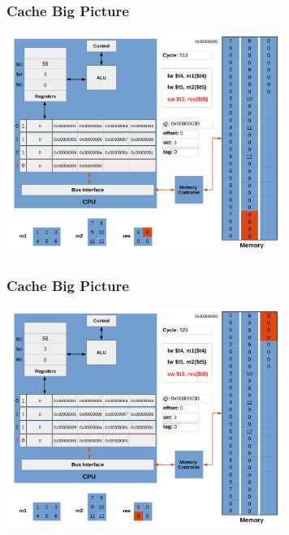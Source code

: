 \documentclass{beamer}
\begin{document}
\begin{frame}[fragile]
\frametitle{Cache Big Picture}

\begin{center}
\vspace*{-0.23cm}
\hspace*{-1cm}\includegraphics[width=9cm]{cache39.pdf}
\end{center}

\end{frame}

\begin{frame}[fragile]
\frametitle{Cache Big Picture}

\begin{center}
\vspace*{-0.23cm}
\hspace*{-1cm}\includegraphics[width=9cm]{cache40.pdf}
\end{center}

\end{frame}
\end{document}
